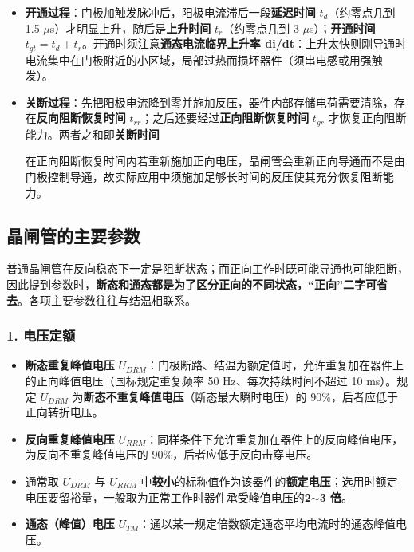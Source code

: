 \begin{itemize}
  \item \textbf{开通过程}：门极加触发脉冲后，阳极电流滞后一段\textbf{延迟时间} $t_d$（约零点几到 1.5 $\mu$s）才明显上升，随后是\textbf{上升时间} $t_r$（约零点几到 3 $\mu$s）；\textbf{开通时间} $t_{gt}=t_d+t_r$。开通时须注意\textbf{通态电流临界上升率 di/dt}：上升太快则刚导通时电流集中在门极附近的小区域，局部过热而损坏器件（须串电感或用强触发）。
  \item \textbf{关断过程}：先把阳极电流降到零并施加反压，器件内部存储电荷需要清除，存在\textbf{反向阻断恢复时间} $t_{rr}$；之后还要经过\textbf{正向阻断恢复时间} $t_{gr}$ 才恢复正向阻断能力。两者之和即\textbf{关断时间}


  在正向阻断恢复时间内若重新施加正向电压，晶闸管会重新正向导通而不是由门极控制导通，故实际应用中须施加足够长时间的反压使其充分恢复阻断能力。
\end{itemize}


\subsection{晶闸管的主要参数}

普通晶闸管在反向稳态下一定是阻断状态；而正向工作时既可能导通也可能阻断，因此提到参数时，\textbf{断态和通态都是为了区分正向的不同状态，“正向”二字可省去}。各项主要参数往往与结温相联系。

\subsubsection*{1. 电压定额}

\begin{itemize}
  \item \textbf{断态重复峰值电压} $U_{DRM}$：门极断路、结温为额定值时，允许重复加在器件上的正向峰值电压（国标规定重复频率 50 Hz、每次持续时间不超过 10 ms）。规定 $U_{DRM}$ 为\textbf{断态不重复峰值电压}（断态最大瞬时电压）的 $90\%$，后者应低于正向转折电压。
  \item \textbf{反向重复峰值电压} $U_{RRM}$：同样条件下允许重复加在器件上的反向峰值电压，为反向不重复峰值电压的 $90\%$，后者应低于反向击穿电压。
  \item 通常取 $U_{DRM}$ 与 $U_{RRM}$ 中\textbf{较小}的标称值作为该器件的\textbf{额定电压}；选用时额定电压要留裕量，一般取为正常工作时器件承受峰值电压的\textbf{2$\sim$3 倍}。
  \item \textbf{通态（峰值）电压} $U_{TM}$：通以某一规定倍数额定通态平均电流时的通态峰值电压。
\end{itemize}


